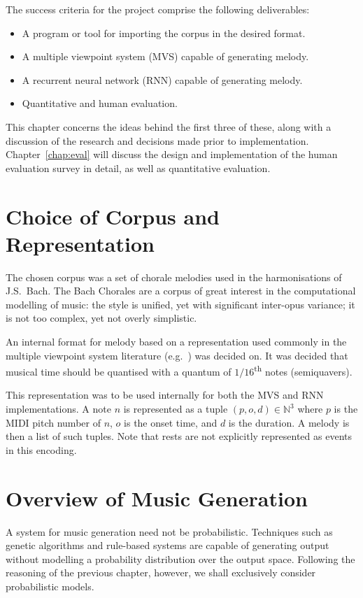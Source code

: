 \documentclass[12pt,a4paper,twoside,openright]{report}
\begin{document}
The success criteria for the project comprise the following deliverables:
\begin{itemize}
  \item A program or tool for importing the corpus in the desired format.
  \item A multiple viewpoint system (MVS) capable of generating melody.
  \item A recurrent neural network (RNN) capable of generating melody.
  \item Quantitative and human evaluation.
\end{itemize}

This chapter concerns the ideas behind the first three of these, along with
a discussion of the research and decisions made prior to implementation.
Chapter~\ref{chap:eval} will discuss the design and implementation of the
human evaluation survey in detail, as well as quantitative evaluation.

\section{Choice of Corpus and Representation}\label{sec:corp-rep}

The chosen corpus was a set of chorale melodies used in the harmonisations of
J.S.\ Bach. The Bach Chorales are a corpus of great interest in the
computational modelling of music: the style is unified, yet with significant
inter-opus variance; it is not too complex, yet not overly simplistic.

An internal format for melody based on a representation used commonly in the
multiple viewpoint system literature (e.g.\ \cite{conklin1995viewpoints}) was
decided on. It was decided that musical time should be quantised with a quantum
of $1/16$\textsuperscript{th} notes (semiquavers). 

This representation was to be used internally for both the MVS and
RNN implementations. A note $n$ is represented as a tuple $(p,o,d) \in
\mathbb{N}^3$ where $p$ is the MIDI pitch number of $n$, $o$ is the onset 
time, and $d$ is the duration. A melody is then a list of such tuples. Note that
rests are not explicitly represented as events in this encoding.

\section{Overview of Music Generation}\label{sec:gen-models}

A system for music generation need not be probabilistic. Techniques such as
genetic algorithms and rule-based systems are capable of generating output
without modelling a probability distribution over the output space. Following
the reasoning of the previous chapter, however, we shall exclusively consider
probabilistic models. 
\end{document}
